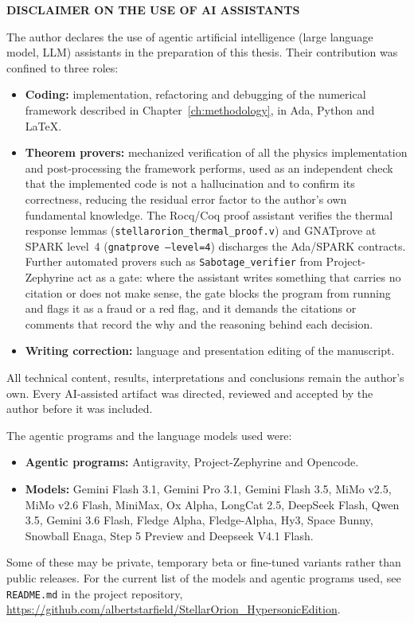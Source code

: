 \clearpage
{}
{}
\begin{center}
\textbf{\large  DISCLAIMER ON THE USE OF AI ASSISTANTS}\\[0.5cm]
\end{center}

\noindent The author declares the use of agentic artificial intelligence (large language model, LLM) assistants in the preparation of this thesis. Their contribution was confined to three roles:

\begin{itemize}
    \item \textbf{Coding:} implementation, refactoring and debugging of the numerical framework described in Chapter~\ref{ch:methodology}, in Ada, Python and \LaTeX.
    \item \textbf{Theorem provers:} mechanized verification of all the physics implementation and post-processing the framework performs, used as an independent check that the implemented code is not a hallucination and to confirm its correctness, reducing the residual error factor to the author's own fundamental knowledge. The Rocq/Coq proof assistant verifies the thermal response lemmas (\texttt{stellarorion\_thermal\_proof.v}) and GNATprove at SPARK level~4 (\texttt{gnatprove --level=4}) discharges the Ada/SPARK contracts. Further automated provers such as \texttt{Sabotage\_verifier} from Project-Zephyrine act as a gate: where the assistant writes something that carries no citation or does not make sense, the gate blocks the program from running and flags it as a fraud or a red flag, and it demands the citations or comments that record the why and the reasoning behind each decision.
    \item \textbf{Writing correction:} language and presentation editing of the manuscript.
\end{itemize}

\noindent All technical content, results, interpretations and conclusions remain the author's own. Every AI-assisted artifact was directed, reviewed and accepted by the author before it was included.

\medskip
\noindent The agentic programs and the language models used were:
\begin{itemize}
    \item \textbf{Agentic programs:} Antigravity, Project-Zephyrine and Opencode.
    \item \textbf{Models:} Gemini Flash 3.1, Gemini Pro 3.1, Gemini Flash 3.5, MiMo v2.5, MiMo v2.6 Flash, MiniMax, Ox Alpha, LongCat 2.5, DeepSeek Flash, Qwen 3.5, Gemini 3.6 Flash, Fledge Alpha, Fledge-Alpha, Hy3, Space Bunny, Snowball Enaga, Step 5 Preview and Deepseek V4.1 Flash.
\end{itemize}

\noindent Some of these may be private, temporary beta or fine-tuned variants rather than public releases. For the current list of the models and agentic programs used, see \texttt{README.md} in the project repository, \url{https://github.com/albertstarfield/StellarOrion_HypersonicEdition}.
